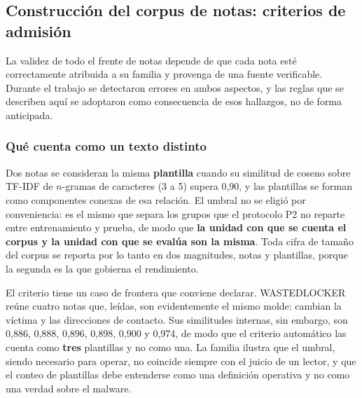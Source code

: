 %
%     

\subsection{Construcción del corpus de notas: criterios de admisión}
\label{subsec:met_admision}

La validez de todo el frente de notas depende de que cada nota esté correctamente atribuida a su familia y provenga de una fuente verificable. Durante el trabajo se detectaron errores en ambos aspectos, y las reglas que se describen aquí se adoptaron como consecuencia de esos hallazgos, no de forma anticipada.

\subsubsection*{Qué cuenta como un texto distinto}

Dos notas se consideran la misma \textbf{plantilla} cuando su similitud de coseno sobre TF-IDF de $n$-gramas de caracteres (3 a 5) supera 0,90, y las plantillas se forman como componentes conexas de esa relación. El umbral no se eligió por conveniencia: es el mismo que separa los grupos que el protocolo P2 no reparte entre entrenamiento y prueba, de modo que \textbf{la unidad con que se cuenta el corpus y la unidad con que se evalúa son la misma}. Toda cifra de tamaño del corpus se reporta por lo tanto en dos magnitudes, notas y plantillas, porque la segunda es la que gobierna el rendimiento.

El criterio tiene un caso de frontera que conviene declarar. WASTEDLOCKER reúne cuatro notas que, leídas, son evidentemente el mismo molde: cambian la víctima y las direcciones de contacto. Sus similitudes internas, sin embargo, son 0,886, 0,888, 0,896, 0,898, 0,900 y 0,974, de modo que el criterio automático las cuenta como \textbf{tres} plantillas y no como una. La familia ilustra que el umbral, siendo necesario para operar, no coincide siempre con el juicio de un lector, y que el conteo de plantillas debe entenderse como una definición operativa y no como una verdad sobre el malware.

